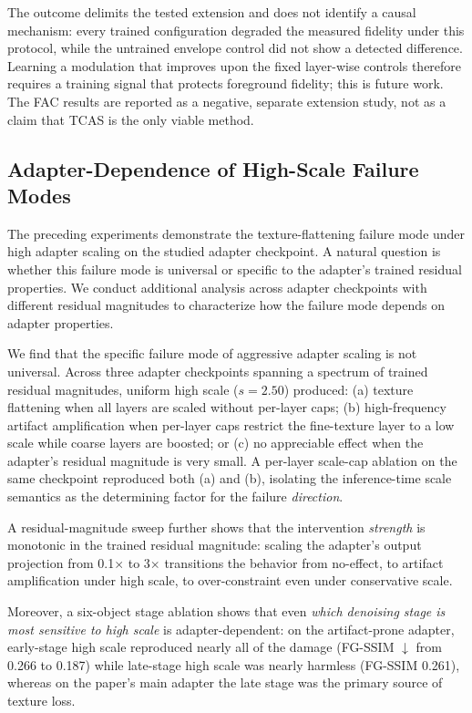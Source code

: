 \documentclass[times,twocolumn,final]{elsarticle}
\begin{document}
The outcome delimits the tested extension and does not identify a causal mechanism: every trained configuration degraded the measured fidelity under this protocol, while the untrained envelope control did not show a detected difference. Learning a modulation that improves upon the fixed layer-wise controls therefore requires a training signal that protects foreground fidelity; this is future work. The FAC results are reported as a negative, separate extension study, not as a claim that TCAS is the only viable method.

\FloatBarrier

\iffalse
\subsection{Adapter-Dependence of High-Scale Failure Modes}
\label{subsec:adapterdep}

The preceding experiments demonstrate the texture-flattening failure mode under high adapter scaling on the studied adapter checkpoint. A natural question is whether this failure mode is universal or specific to the adapter's trained residual properties. We conduct additional analysis across adapter checkpoints with different residual magnitudes to characterize how the failure mode depends on adapter properties.

We find that the specific failure mode of aggressive adapter scaling is not universal. Across three adapter checkpoints spanning a spectrum of trained residual magnitudes, uniform high scale ($s = 2.50$) produced: (a) texture flattening when all layers are scaled without per-layer caps; (b) high-frequency artifact amplification when per-layer caps restrict the fine-texture layer to a low scale while coarse layers are boosted; or (c) no appreciable effect when the adapter's residual magnitude is very small. A per-layer scale-cap ablation on the same checkpoint reproduced both (a) and (b), isolating the inference-time scale semantics as the determining factor for the failure \emph{direction}.

A residual-magnitude sweep further shows that the intervention \emph{strength} is monotonic in the trained residual magnitude: scaling the adapter's output projection from 0.1$\times$ to 3$\times$ transitions the behavior from no-effect, to artifact amplification under high scale, to over-constraint even under conservative scale.

Moreover, a six-object stage ablation shows that even \emph{which denoising stage is most sensitive to high scale} is adapter-dependent: on the artifact-prone adapter, early-stage high scale reproduced nearly all of the damage (FG-SSIM $\downarrow$ from 0.266 to 0.187) while late-stage high scale was nearly harmless (FG-SSIM 0.261), whereas on the paper's main adapter the late stage was the primary source of texture loss.
\end{document}
